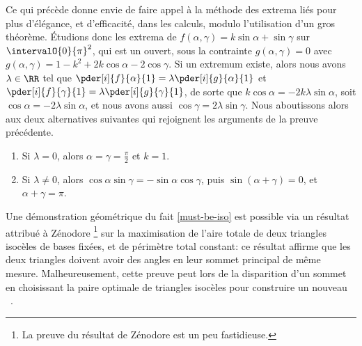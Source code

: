 \begin{remark}
    Ce qui précède donne envie de faire appel à la méthode des extrema liés pour plus d'élégance, et d'efficacité, dans les calculs, modulo l'utilisation d'un gros théorème.
    Étudions donc les extrema de
	$f(\alpha , \gamma) = k \sin \alpha + \sin \gamma$
	sur $\intervalO{0}{\pi}^2$, qui est un ouvert,
	sous la contrainte $g(\alpha , \gamma) = 0$
	avec
	$g(\alpha , \gamma) = 1 - k^2 + 2 k \cos \alpha - 2 \cos \gamma$.
    Si un extremum existe, alors nous avons $\lambda \in \RR$ tel que
    $\pder[i]{f}{\alpha}{1} = \lambda \pder[i]{g}{\alpha}{1}$
	et
    $\pder[i]{f}{\gamma}{1} = \lambda \pder[i]{g}{\gamma}{1}$,
	de sorte que
	$k \cos \alpha = - 2 k \lambda \sin \alpha$,
	soit
	$\cos \alpha = - 2 \lambda \sin \alpha$,
	et nous avons aussi
	$\cos \gamma = 2 \lambda \sin \gamma$.
	Nous aboutissons alors aux deux alternatives suivantes qui rejoignent les arguments de la preuve précédente.
	\begin{enumerate}
	    \item Si $\lambda = 0$,
	    alors
	    $\alpha = \gamma = \frac{\pi}{2}$ et $k = 1$. 

	    \item Si $\lambda \neq 0$,
	    alors
	    $\cos \alpha \sin \gamma = - \sin \alpha \cos \gamma$,
	    puis
	    $\sin (\alpha + \gamma) = 0$,
	    et
	    $\alpha + \gamma = \pi$.
	\end{enumerate}
\end{remark}


%    


\begin{remark}
	Une démonstration géométrique du fait \ref{must-be-iso} est possible via un résultat attribué à Zénodore%
	\footnote{
	    La preuve du résultat de Zénodore est un peu fastidieuse.
	}
	sur la maximisation de l'aire totale de deux triangles isocèles de bases fixées, et de périmètre total constant:
	ce résultat affirme que les deux triangles doivent avoir des angles en leur sommet principal de même mesure.
	Malheureusement, cette preuve peut  lors de la disparition d'un sommet en choisissant la paire optimale de triangles isocèles pour construire un nouveau \ngone\ .
\end{remark}


